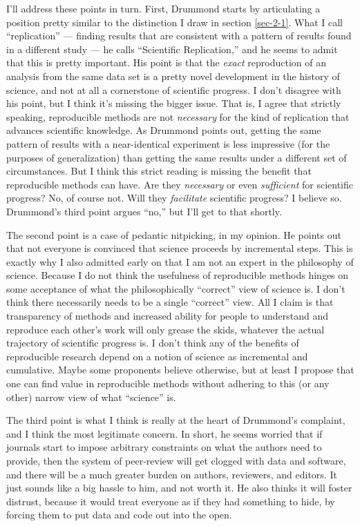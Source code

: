 \documentclass{book}
\begin{document}
I'll address these points in turn. First, Drummond starts by articulating a position pretty similar to the distinction I draw in section \ref{sec-2-1}. What I call ``replication'' --- finding results that are consistent with a pattern of results found in a different study --- he calls ``Scientific Replication,'' and he seems to admit that this is pretty important. His point is that the \emph{exact} reproduction of an analysis from the same data set is a pretty novel development in the history of science, and not at all a cornerstone of scientific progress. I don't disagree with his point, but I think it's missing the bigger issue. That is, I agree that strictly speaking, reproducible methods are not \emph{necessary} for the kind of replication that advances scientific knowledge. As Drummond points out, getting the same pattern of results with a near-identical experiment is less impressive (for the purposes of generalization) than getting the same results under a different set of circumstances.  But I think this strict reading is missing the benefit that reproducible methods can have. Are they \emph{necessary} or even \emph{sufficient} for scientific progress? No, of course not. Will they \emph{facilitate} scientific progress?  I believe so. Drummond's third point argues ``no,'' but I'll get to that shortly.

The second point is a case of pedantic nitpicking, in my opinion. He points out that not everyone is convinced that science proceeds by incremental steps. This is exactly why I also admitted early on that I am not an expert in the philosophy of science. Because I do not think the usefulness of reproducible methods hinges on some acceptance of what the philosophically ``correct'' view of science is. I don't think there necessarily needs to be a single ``correct'' view. All I claim is that transparency of methods and increased ability for people to understand and reproduce each other's work will only grease the skids, whatever the actual trajectory of scientific progress is. I don't think any of the benefits of reproducible research depend on a notion of science as incremental and cumulative.  Maybe some proponents believe otherwise, but at least I propose that one can find value in reproducible methods without adhering to this (or any other) narrow view of what ``science'' is.

The third point is what I think is really at the heart of Drummond's complaint, and I think the most legitimate concern. In short, he seems worried that if journals start to impose arbitrary constraints on what the authors need to provide, then the system of peer-review will get clogged with data and software, and there will be a much greater burden on authors, reviewers, and editors. It just sounds like a big hassle to him, and not worth it. He also thinks it will foster distrust, because it would treat everyone as if they had something to hide, by forcing them to put data and code out into the open. 
\end{document}
